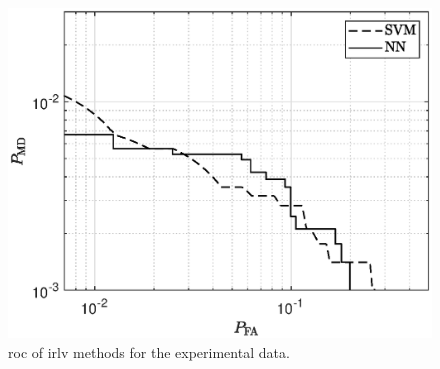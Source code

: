 \documentclass[draftcls,journal,onecolumn]{IEEEtran}
\begin{document}

\begin{figure}[t]
    \centering
    \includegraphics[width=\columnwidth]{berlinNew.eps}
    \caption{\ac{roc} of \ac{irlv} methods for the experimental data.}
    \label{fig:Berlinnew}
\end{figure}
\end{document}
